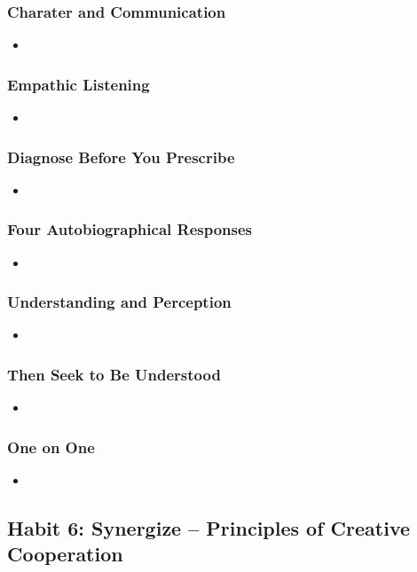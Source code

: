 \documentclass[11pt]{article}
\begin{document}
\subsubsection{Charater and Communication}
\begin{itemize}
\item 
\end{itemize}
\subsubsection{Empathic Listening}
\begin{itemize}
\item 
\end{itemize}
\subsubsection{Diagnose Before You Prescribe}
\begin{itemize}
\item 
\end{itemize}
\subsubsection{Four Autobiographical Responses}
\begin{itemize}
\item 
\end{itemize}
\subsubsection{Understanding and Perception}
\begin{itemize}
\item 
\end{itemize}
\subsubsection{Then Seek to Be Understood}
\begin{itemize}
\item 
\end{itemize}
\subsubsection{One on One}
\begin{itemize}
\item 
\end{itemize}
\subsection{Habit 6: Synergize -- Principles of Creative Cooperation}
\end{document}
